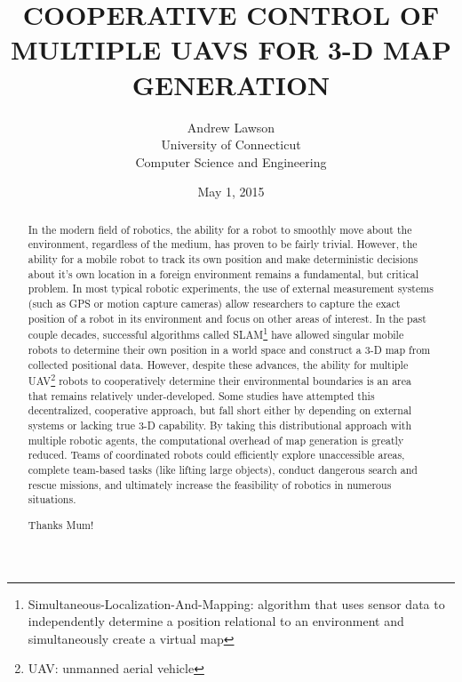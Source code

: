 \documentclass[letterpaper, oneside, 12pt]{report}
\title{\large COOPERATIVE CONTROL OF MULTIPLE UAVS FOR 3-D MAP GENERATION}
\author{
  \large
  Andrew Lawson \\
  University of Connecticut \\
  Computer Science and Engineering
}
\date{\large May 1, 2015}
\begin{document}
\doublespacing

\begin{titlepage}
  \maketitle
  \thispagestyle{empty}
\end{titlepage}
\clearpage

\begin{abstract}
  In the modern field of robotics, the ability for a robot to smoothly move about the environment, regardless of the medium, has proven to be fairly trivial. However, the ability for a mobile robot to track its own position and make deterministic decisions about it's own location in a foreign environment remains a fundamental, but critical problem. In most typical robotic experiments, the use of external measurement systems (such as GPS or motion capture cameras) allow researchers to capture the exact position of a robot in its environment and focus on other areas of interest. In the past couple decades, successful algorithms called SLAM\footnote{Simultaneous-Localization-And-Mapping: algorithm that uses sensor data to independently determine a position relational to an environment and simultaneously create a virtual map} have allowed singular mobile robots to determine their own position in a world space and construct a 3-D map from collected positional data. However, despite these advances, the ability for multiple UAV\footnote{UAV: unmanned aerial vehicle} robots to cooperatively determine their environmental boundaries is an area that remains relatively under-developed. Some studies have attempted this decentralized, cooperative approach, but fall short either by depending on external systems or lacking true 3-D capability. By taking this distributional approach with multiple robotic agents, the computational overhead of map generation is greatly reduced. Teams of coordinated robots could efficiently explore unaccessible areas, complete team-based tasks (like lifting large objects), conduct dangerous search and rescue missions, and ultimately increase the feasibility of robotics in numerous situations.
\end{abstract}
\clearpage

\renewcommand{\abstractname}{Acknowledgements}
\begin{abstract}
 Thanks Mum!
\end{abstract}
\clearpage

\tableofcontents
\listoffigures
\listoftables
\clearpage
\end{document}
